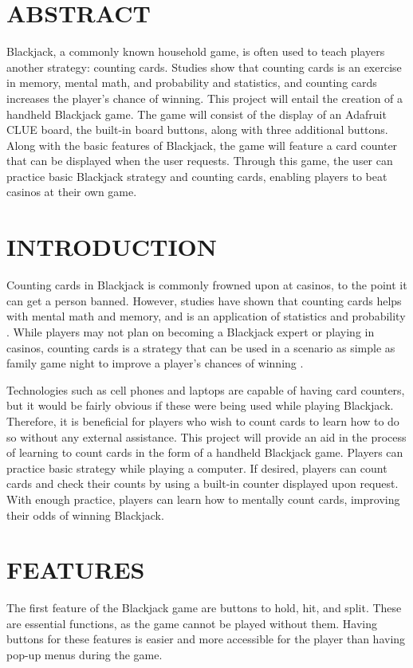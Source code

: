 \documentclass[12pt]{article}
\begin{document}
\section{ABSTRACT}
Blackjack, a commonly known household game, is often used to teach players another strategy: counting cards. Studies show that counting cards is an exercise in memory, mental math, and probability and statistics, and counting cards increases the player’s chance of winning. This project will entail the creation of a handheld Blackjack game. The game will consist of the display of an Adafruit CLUE board, the built-in board buttons, along with three additional buttons. Along with the basic features of Blackjack, the game will feature a card counter that can be displayed when the user requests. Through this game, the user can practice basic Blackjack strategy and counting cards, enabling players to beat casinos at their own game.


\section{INTRODUCTION}
Counting cards in Blackjack is commonly frowned upon at casinos, to the point it can get a person banned. However, studies have shown that counting cards helps with mental math and memory, and is an application of statistics and probability \cite{crafton2020counting}. While players may not plan on becoming a Blackjack expert or playing in casinos, counting cards is a strategy that can be used in a scenario as simple as family game night to improve a player’s chances of winning \cite{zimran2009game}. 

Technologies such as cell phones and laptops are capable of having card counters, but it would be fairly obvious if these were being used while playing Blackjack. Therefore, it is beneficial for players who wish to count cards to learn how to do so without any external assistance. This project will provide an aid in the process of learning to count cards in the form of a handheld Blackjack game. Players can practice basic strategy while playing a computer. If desired, players can count cards and check their counts by using a built-in counter displayed upon request. With enough practice, players can learn how to mentally count cards, improving their odds of winning Blackjack.


\section{FEATURES}
The first feature of the Blackjack game are buttons to hold, hit, and split. These are essential functions, as the game cannot be played without them. Having buttons for these features is easier and more accessible for the player than having pop-up menus during the game.
\end{document}
